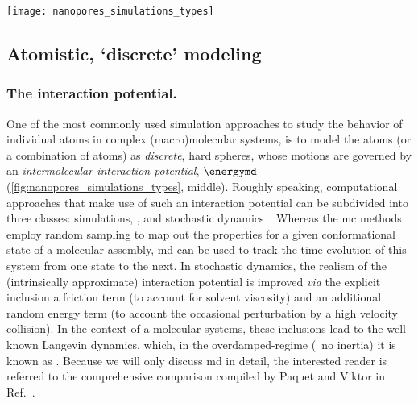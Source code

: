 %
\begin{figure*}[b]
  \centering
  
  \texttt{[image: nanopores\_simulations\_types]}

\caption[Hierarchy of simulation methodologies]{%
  \textbf{Hierarchy of simulation methodologies.}
  Quantum mechanical methods (left) have the highest precision, as they model the nuclei and electron
  distributions of atoms explicitly. However, they also the have highest computational cost and are often
  only employed to parameterize the interaction potentials and partial charges used for the atomistic modeling
  methods (middle, \eg~molecular dynamics). Further averaging of the interaction potential over multiple atoms
  gives rise to continuum or `mean-field' methods (right), where the discreteness of the atoms is replaced by
  a structureless medium with material properties (\eg~relative permittivity, concentration).
  }\label{fig:nanopores_simulations_types}
\end{figure*}
%



\subsection{Atomistic, `discrete' modeling}
%

\subsubsection{The interaction potential.}
%

One of the most commonly used simulation approaches to study the behavior of individual atoms in complex
(macro)molecular systems, is to model the atoms (or a combination of atoms) as \emph{discrete}, hard spheres,
whose motions are governed by an \emph{intermolecular interaction potential}, $\energymd$
(\cref{fig:nanopores_simulations_types}, middle). Roughly speaking, computational approaches that make use of
such an interaction potential can be subdivided into three classes:  simulations, ,
and stochastic dynamics~\cite{Paquet-2015}. Whereas the \gls{mc} methods employ random sampling to map out the
properties for a given conformational state of a molecular assembly, \gls{md} can be used to track the
time-evolution of this system from one state to the next. In stochastic dynamics, the realism of the
(intrinsically approximate) interaction potential is improved \textit{via} the explicit inclusion a friction
term (to account for solvent viscosity) and an additional random energy term (to account the occasional
perturbation by a high velocity collision). In the context of a molecular systems, these inclusions lead to
the well-known Langevin dynamics, which, in the overdamped-regime (\ie~no inertia) it is known as
. Because we will only discuss \gls{md} in detail, the interested reader is referred to the
comprehensive comparison compiled by Paquet and Viktor in Ref.~\cite{Paquet-2015}.

